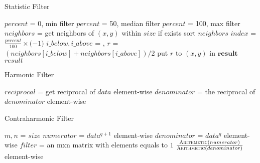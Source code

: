 \documentclass{article}
\begin{document}
  \begin{algorithm}
    \caption{Statistic Filter}
    \label{Statistic}
    \begin{algorithmic}[1]
    \LineComment $percent$ = 0, min filter
    \LineComment $percent$ = 50, median filter
    \LineComment $percent$ = 100, max filter
    \State $neighbors$ = get neighbors of $(x,y)$ within $size$ if exists
    \State sort $neighbors$
    \State $index$ = $\frac{percent}{100}\times($$-1)$
    \State $i\_below, i\_above$ = , 
    \State $r$ = $(neighbors[i\_below] + neighbors[i\_above]) / 2$
    \State put $r$ to $(x,y)$ in $\mathbf{result}$
    \EndFor
    \State \Return $result$
    \EndFunction
    \end{algorithmic}
  \end{algorithm}

  \newpage

  \begin{algorithm}
    \caption{Harmonic Filter}
    \label{Harmonic}
    \begin{algorithmic}[1]
    \State $reciprocal$ = get reciprocal of $data$ element-wise
    \State $denominator$ = 
    \State \Return the reciprocal of $denominator$ element-wise
    \EndFunction
    \end{algorithmic}
  \end{algorithm}

  \begin{algorithm}
    \caption{Contraharmonic Filter}
    \label{Contraharmonic}
    \begin{algorithmic}[1]
    \State $m,n$ = $size$
    \State $numerator$ = $data^{q+1}$ element-wise
    \State $denominator$ = $data^{q}$ element-wise
    \State $filter$ = an mxn matrix with elements equals to $1$
    \State \Return $\frac{\Call{Arithmetic}{numerator}}{\Call{Arithmetic}{denominator}}$ element-wise
    \EndFunction
    \end{algorithmic}
  \end{algorithm}
\end{document}
